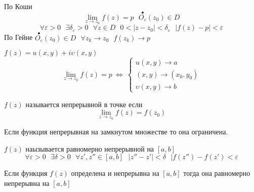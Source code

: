 \begin{define}
  По Коши
  $$
  \lim_{z \to z_0} f(z) = p ~~~ \stackrel{\bullet}{O_{\varepsilon}}(z_0) \in D
  $$
  $$
  \forall \varepsilon > 0 ~~~ \exists \delta_{\varepsilon} > 0 ~~~
  \forall z \in D ~~~ 0 < |z - z_0| < \delta_{\varepsilon} ~~~
  |f(z) - p| < \varepsilon
  $$
  По Гейне
  $\stackrel{\bullet}{O_{\varepsilon}}(z_0) \in D ~~~ \forall z_k \to z_0 ~~~
  f(z_k) \to p$
\end{define}

\begin{block}
  $f(z) = u(x, y) + i\upsilon(x,y)$
  $$
  \lim_{z \to z_0} f(z) = p ~ \Leftrightarrow ~
  \left\{
  \begin{array}{l}
    u(x,y) \to a \\
    (x,y) \to (x_0, y_0) \\
    \upsilon(x,y) \to b
  \end{array}
  \right.
  $$
\end{block}

\begin{define}
  $f(z)$ называется непрерывной в точке если
  $$
  \lim_{z \to z_0} f(z) = f(z_0)
  $$
\end{define}

\begin{theorem}[Вейерштрасса]
  Если функция непрерывная на замкнутом множестве то она ограничена.
\end{theorem}

\begin{theorem}
  $f(z)$ наызывается равномерно непрерывной на $[a,b]$
  $$
  \forall \varepsilon > 0 ~~~ \exists \delta > 0 ~~~ \forall z', z'' \in [a,b]
  ~~~ |z'' - z'| < \delta ~~~ |f(z'') - f(z') < \varepsilon
  $$
\end{theorem}

\begin{theorem}[Кантора]
  Если функция $f(z)$ определена и непрерывна на $[a,b]$ тогда она равномерно
  непрерывна на $[a,b]$
\end{theorem}
